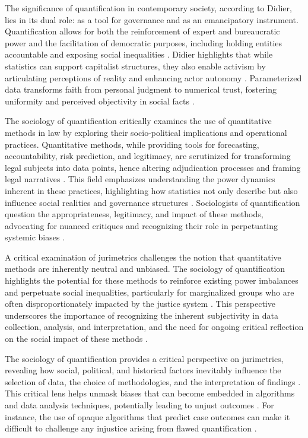 The significance of quantification in contemporary society, according to Didier, lies in its dual role: as a tool for governance and as an emancipatory instrument. Quantification allows for both the reinforcement of expert and bureaucratic power and the facilitation of democratic purposes, including holding entities accountable and exposing social inequalities \cite{demortain2019,didier2021,paiva2021}. Didier highlights that while statistics can support capitalist structures, they also enable activism by articulating perceptions of reality and enhancing actor autonomy \cite{didier2021}. Parameterized data transforms faith from personal judgment to numerical trust, fostering uniformity and perceived objectivity in social facts \cite{vernant2006}.

The sociology of quantification critically examines the use of quantitative methods in law by exploring their socio-political implications and operational practices. Quantitative methods, while providing tools for forecasting, accountability, risk prediction, and legitimacy, are scrutinized for transforming legal subjects into data points, hence altering adjudication processes and framing legal narratives \cite{lynch2019,lynch2019}. This field emphasizes understanding the power dynamics inherent in these practices, highlighting how statistics not only describe but also influence social realities and governance structures \cite{paiva2021,saltelli2020,camargo2021}. Sociologists of quantification question the appropriateness, legitimacy, and impact of these methods, advocating for nuanced critiques and recognizing their role in perpetuating systemic biases \cite{gillborn2017,ribeiro2021}.

A critical examination of jurimetrics challenges the notion that quantitative methods are inherently neutral and unbiased. The sociology of quantification highlights the potential for these methods to reinforce existing power imbalances and perpetuate social inequalities, particularly for marginalized groups who are often disproportionately impacted by the justice system \cite{10.5040/9781350220645,10.1080/07329113.2015.1046739}. This perspective underscores the importance of recognizing the inherent subjectivity in data collection, analysis, and interpretation, and the need for ongoing critical reflection on the social impact of these methods \cite{10.5040/9781350220645,10.1080/07329113.2015.1046739}.

The sociology of quantification provides a critical perspective on jurimetrics, revealing how social, political, and historical factors inevitably influence the selection of data, the choice of methodologies, and the interpretation of findings \cite{10.1590/dados.2022.65.3.267,10.3390/fi9040068}. This critical lens helps unmask biases that can become embedded in algorithms and data analysis techniques, potentially leading to unjust outcomes \cite{10.1590/dados.2022.65.3.267,10.3390/fi9040068}. For instance, the use of opaque algorithms that predict case outcomes can make it difficult to challenge any injustice arising from flawed quantification \cite{10.1590/dados.2022.65.3.267,10.1057/s41599-020-0396-5}.

